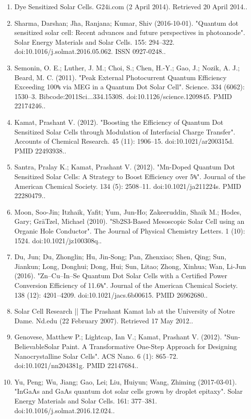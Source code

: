 \begin{enumerate}
\item Dye Sensitized Solar Cells. G24i.com (2 April 2014). Retrieved 20 April 2014..
\item Sharma, Darshan; Jha, Ranjana; Kumar, Shiv (2016-10-01). "Quantum dot sensitized solar cell: Recent advances and future perspectives in photoanode". Solar Energy Materials and Solar Cells. 155: 294–322. doi:10.1016/j.solmat.2016.05.062. ISSN 0927-0248..
\item Semonin, O. E.; Luther, J. M.; Choi, S.; Chen, H.-Y.; Gao, J.; Nozik, A. J.; Beard, M. C. (2011). "Peak External Photocurrent Quantum Efficiency Exceeding 100\verb|%| via MEG in a Quantum Dot Solar Cell". Science. 334 (6062): 1530–3. Bibcode:2011Sci...334.1530S. doi:10.1126/science.1209845. PMID 22174246..
\item Kamat, Prashant V. (2012). "Boosting the Efficiency of Quantum Dot Sensitized Solar Cells through Modulation of Interfacial Charge Transfer". Accounts of Chemical Research. 45 (11): 1906–15. doi:10.1021/ar200315d. PMID 22493938..
\item Santra, Pralay K.; Kamat, Prashant V. (2012). "Mn-Doped Quantum Dot Sensitized Solar Cells: A Strategy to Boost Efficiency over 5\verb|%|". Journal of the American Chemical Society. 134 (5): 2508–11. doi:10.1021/ja211224s. PMID 22280479..
\item Moon, Soo-Jin; Itzhaik, Yafit; Yum, Jun-Ho; Zakeeruddin, Shaik M.; Hodes, Gary; GräTzel, Michael (2010). "Sb2S3-Based Mesoscopic Solar Cell using an Organic Hole Conductor". The Journal of Physical Chemistry Letters. 1 (10): 1524. doi:10.1021/jz100308q..
\item Du, Jun; Du, Zhonglin; Hu, Jin-Song; Pan, Zhenxiao; Shen, Qing; Sun, Jiankun; Long, Donghui; Dong, Hui; Sun, Litao; Zhong, Xinhua; Wan, Li-Jun (2016). "Zn–Cu–In–Se Quantum Dot Solar Cells with a Certified Power Conversion Efficiency of 11.6\verb|%|". Journal of the American Chemical Society. 138 (12): 4201–4209. doi:10.1021/jacs.6b00615. PMID 26962680..
\item Solar Cell Research || The Prashant Kamat lab at the University of Notre Dame. Nd.edu (22 February 2007). Retrieved 17 May 2012..
\item Genovese, Matthew P.; Lightcap, Ian V.; Kamat, Prashant V. (2012). "Sun-BelievableSolar Paint. A Transformative One-Step Approach for Designing Nanocrystalline Solar Cells". ACS Nano. 6 (1): 865–72. doi:10.1021/nn204381g. PMID 22147684..
\item Yu, Peng; Wu, Jiang; Gao, Lei; Liu, Huiyun; Wang, Zhiming (2017-03-01). "InGaAs and GaAs quantum dot solar cells grown by droplet epitaxy". Solar Energy Materials and Solar Cells. 161: 377–381. doi:10.1016/j.solmat.2016.12.024..

\end{enumerate}
